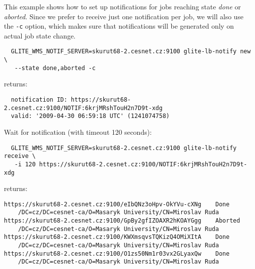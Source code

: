 This example shows how to set up notifications for jobs reaching state \emph{done} or \emph {aborted}. Since we prefer to receive just one notification per job, we will also use the \texttt{-c} option, which makes sure that notifications will be generated only on actual job state change.


\begin{verbatim}
  GLITE_WMS_NOTIF_SERVER=skurut68-2.cesnet.cz:9100 glite-lb-notify new \
   --state done,aborted -c
\end{verbatim}

returns:

\begin{verbatim}
  notification ID: https://skurut68-2.cesnet.cz:9100/NOTIF:6krjMRshTouH2n7D9t-xdg 
  valid: '2009-04-30 06:59:18 UTC' (1241074758)	
\end{verbatim}

Wait for notification (with timeout 120 seconds):
\begin{verbatim}
  GLITE_WMS_NOTIF_SERVER=skurut68-2.cesnet.cz:9100 glite-lb-notify receive \
   -i 120 https://skurut68-2.cesnet.cz:9100/NOTIF:6krjMRshTouH2n7D9t-xdg 
\end{verbatim}

returns:
\begin{verbatim}
https://skurut68-2.cesnet.cz:9100/eIbQNz3oHpv-OkYVu-cXNg	Done
    /DC=cz/DC=cesnet-ca/O=Masaryk University/CN=Miroslav Ruda
https://skurut68-2.cesnet.cz:9100/GpBy2gfIZOAXR2hKOAYGgg	Aborted
    /DC=cz/DC=cesnet-ca/O=Masaryk University/CN=Miroslav Ruda
https://skurut68-2.cesnet.cz:9100/KWXmsqvsTQKizQ4OMiXItA	Done
    /DC=cz/DC=cesnet-ca/O=Masaryk University/CN=Miroslav Ruda
https://skurut68-2.cesnet.cz:9100/O1zs50Nm1r03vx2GLyaxQw	Done
    /DC=cz/DC=cesnet-ca/O=Masaryk University/CN=Miroslav Ruda
\end{verbatim}

